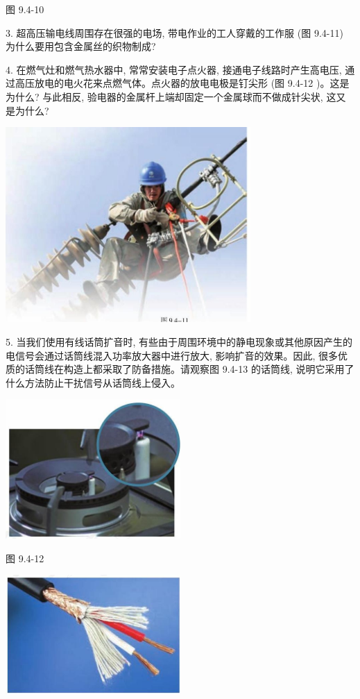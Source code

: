 \documentclass[10pt]{article}
\begin{document}
图 9.4-10

3. 超高压输电线周围存在很强的电场, 带电作业的工人穿戴的工作服 (图 9.4-11) 为什么要用包含金属丝的织物制成?

4. 在燃气灶和燃气热水器中, 常常安装电子点火器, 接通电子线路时产生高电压, 通过高压放电的电火花来点燃气体。点火器的放电电极是钉尖形 (图 9.4-12 )。这是为什么? 与此相反, 验电器的金属杆上端却固定一个金属球而不做成针尖状, 这又是为什么?

\begin{center}
\includegraphics[max width=0.7\textwidth]{images/01911d5f-8e38-70c0-b5b8-2b399bd115b6_27_801922.jpg}
\end{center}

5. 当我们使用有线话筒扩音时, 有些由于周围环境中的静电现象或其他原因产生的电信号会通过话筒线混入功率放大器中进行放大, 影响扩音的效果。因此, 很多优质的话筒线在构造上都采取了防备措施。请观察图 9.4-13 的话筒线, 说明它采用了什么方法防止干扰信号从话筒线上侵入。

\begin{center}
\includegraphics[max width=0.5\textwidth]{images/01911d5f-8e38-70c0-b5b8-2b399bd115b6_27_365354.jpg}
\end{center}

图 9.4-12

\begin{center}
\includegraphics[max width=0.5\textwidth]{images/01911d5f-8e38-70c0-b5b8-2b399bd115b6_27_504066.jpg}
\end{center}
\end{document}

